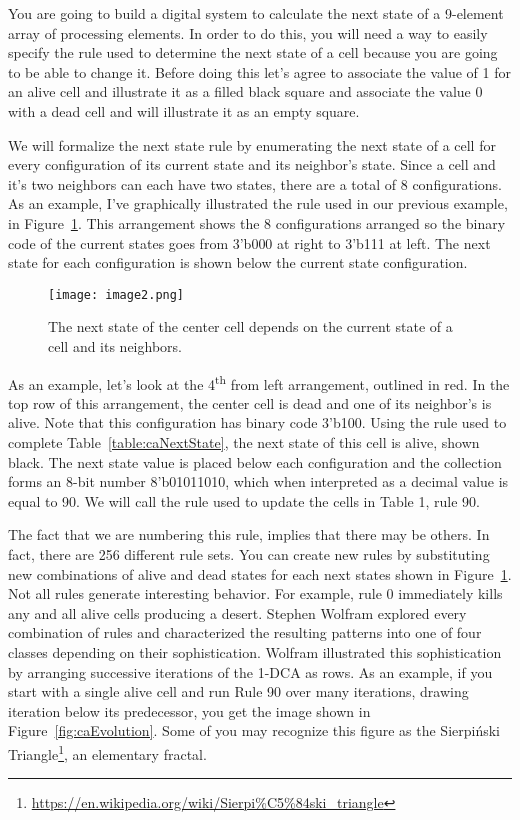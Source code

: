 You are going to build a digital system to calculate the next state of a
9-element array of processing elements. In order to do this, you will
need a way to easily specify the rule used to determine the next state
of a cell because you are going to be able to change it. Before doing
this let's agree to associate the value of 1 for an alive cell and
illustrate it as a filled black square and associate the value 0 with a
dead cell and will illustrate it as an empty square.

We will formalize the next state rule by enumerating the next state of a
cell for every configuration of its current state and its neighbor's
state. Since a cell and it's two neighbors can each have two states,
there are a total of 8 configurations. As an example, I've graphically
illustrated the rule used in our previous example, in Figure~\ref{fig:caRule}. This
arrangement shows the 8 configurations arranged so the binary code of
the current states goes from 3'b000 at right to 3'b111 at left. The next
state for each configuration is shown below the current state
configuration.

\begin{figure}[ht]
    \texttt{[image: image2.png]}
    \caption{The next state of the center cell depends on the current state
    of a cell and its neighbors.}
    \label{fig:caRule}
\end{figure}

\pagebreak

As an example, let's look at the 4\textsuperscript{th} from left
arrangement, outlined in red. In the top row of this arrangement, the
center cell is dead and one of its neighbor's is alive.  Note that this
configuration has binary code 3'b100. Using the rule used to complete
Table~\ref{table:caNextState}, the next state of this cell is alive, shown black. The next
state value is placed below each configuration and the collection forms
an 8-bit number 8'b01011010, which when interpreted as a decimal value
is equal to 90. We will call the rule used to update the cells in Table
1, rule 90.

The fact that we are numbering this rule, implies that there may be
others. In fact, there are 256 different rule sets. You can create new
rules by substituting new combinations of alive and dead states for each
next states shown in Figure~\ref{fig:caRule}. Not all rules generate interesting
behavior. For example, rule 0 immediately kills any and all alive cells
producing a desert. Stephen Wolfram explored every combination of rules
and characterized the resulting patterns into one of four classes
depending on their sophistication. Wolfram illustrated this
sophistication by arranging successive iterations of the 1-DCA as rows.
As an example, if you start with a single alive cell and run Rule 90
over many iterations, drawing iteration below its predecessor, you get
the image shown in Figure~\ref{fig:caEvolution}. Some of you may recognize this figure as
the Sierpiński Triangle\footnote{\url{https://en.wikipedia.org/wiki/Sierpi\%C5\%84ski_triangle}},
an elementary fractal.

